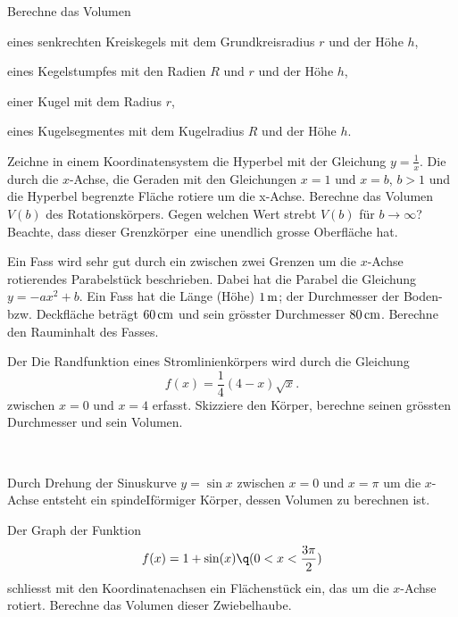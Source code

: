 \documentclass[%
11pt,%
twoside,%
titlepage,%
german,%
headsepline%
]{scrartcl}
\begin{document}
\begin{ueb}[checkmate!]
Berechne das Volumen
\begin{enumeratea}
\item eines senkrechten Kreiskegels mit dem Grundkreisradius $r$ und der Höhe $h$,
\item eines Kegelstumpfes mit den Radien $R$ und $r$ und der Höhe $h$,
\item einer Kugel mit dem Radius $r$,
\item eines Kugelsegmentes mit dem Kugelradius $R$ und der Höhe $h$.
\end{enumeratea}
\end{ueb}

\begin{ueb}[hyperbolisch]
Zeichne in einem Koordinatensystem die Hyperbel mit der Gleichung $y=\frac{1}{x}$. Die durch die $x$-Achse, die Geraden mit den Gleichungen $x = 1$ und $x = b$, $b>1$ und die Hyperbel begrenzte Fläche rotiere um die x-Achse. Berechne das Volumen $V(b)$ des Rotationskörpers. Gegen welchen Wert strebt $V(b)$ für $b\to\infty$? Beachte, dass dieser \glqq Grenzkörper\grqq\ eine unendlich grosse Oberfläche hat.
\end{ueb}

\begin{ueb}
Ein Fass wird sehr gut durch ein zwischen zwei Grenzen um die $x$-Achse rotierendes Parabelstück beschrieben. Dabei hat die Parabel die Gleichung $y = - ax^2+b$. Ein Fass hat die Länge (Höhe) $\unit[1]{m}$; der Durchmesser der Boden- bzw. Deckfläche beträgt $\unit[60]{cm}$ und sein grösster Durchmesser $\unit[80]{cm}$. Berechne den Rauminhalt des Fasses.
\end{ueb}

\begin{ueb}[Tropf]
Der
Die Randfunktion eines Stromlinienkörpers wird durch die Gleichung
$$f(x)=\frac{1}{4}(4-x)\sqrt{x}.$$
zwischen $x = 0$ und $x = 4$ erfasst. Skizziere den Körper, berechne seinen grössten Durchmesser und sein Volumen.
\end{ueb}

\begin{ueb}[Träne]
\ \\[-4ex]
\begin{enumeratea}
\item Durch Drehung der Sinuskurve $y = \sin x$ zwischen $x = 0$ und $x = \pi$ um die $x$-Achse entsteht ein spindeIförmiger Körper, dessen Volumen zu berechnen ist.
\item Der Graph der Funktion
$$f(x)=1+\sin(x)\q(0<x<\frac{3\pi}{2})$$
schliesst mit den Koordinatenachsen ein Flächenstück ein, das um die $x$-Achse rotiert. Berechne das Volumen dieser \glqq Zwiebelhaube\grqq.
\end{enumeratea}
\end{ueb}

\cleardoublepage
\listoffigures
%
%
\end{document}
